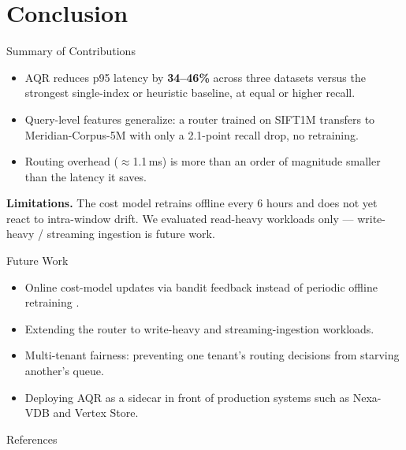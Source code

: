 \section{Conclusion}

\begin{frame}{Summary of Contributions}
\begin{itemize}
\item AQR reduces p95 latency by \textbf{34--46\%} across three datasets versus the strongest single-index or heuristic baseline, at equal or higher recall.
\item Query-level features generalize: a router trained on SIFT1M transfers to Meridian-Corpus-5M with only a 2.1-point recall drop, no retraining.
\item Routing overhead ($\approx$1.1\,ms) is more than an order of magnitude smaller than the latency it saves.
\end{itemize}
\vspace{0.3cm}
\textbf{Limitations.} The cost model retrains offline every 6 hours and does not yet react to intra-window drift. We evaluated read-heavy workloads only --- write-heavy / streaming ingestion is future work.
\end{frame}

\begin{frame}{Future Work}
\begin{itemize}
\item Online cost-model updates via bandit feedback instead of periodic offline retraining \cite{ramirez2021bandit}.
\item Extending the router to write-heavy and streaming-ingestion workloads.
\item Multi-tenant fairness: preventing one tenant's routing decisions from starving another's queue.
\item Deploying AQR as a sidecar in front of production systems such as Nexa-VDB and Vertex Store.
\end{itemize}
\end{frame}

\begin{frame}[allowframebreaks]{References}
\tiny
\nocite{*}


\end{frame}

\begin{frame}[plain]
\end{frame}

